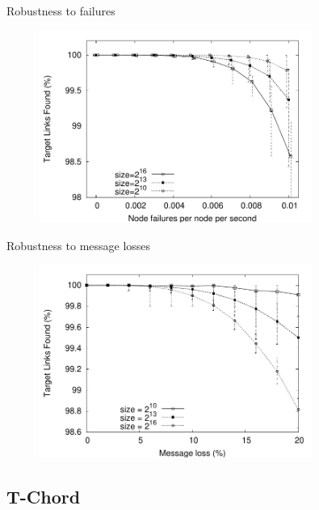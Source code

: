 \begin{frame}{Robustness to failures}
	
\begin{figure}
	\includegraphics[width=0.80\textwidth]{sort-crash}
\end{figure}	
	
\end{frame}

\begin{frame}{Robustness to message losses}
	
\begin{figure}
	\includegraphics[width=0.80\textwidth]{sort-loss-qual}
\end{figure}	
	
\end{frame}

\subsection{T-Chord}

